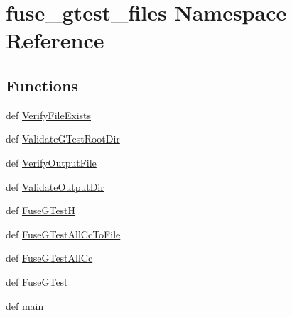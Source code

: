 \hypertarget{namespacefuse__gtest__files}{\section{fuse\-\_\-gtest\-\_\-files Namespace Reference}
\label{namespacefuse__gtest__files}
}
\subsection*{Functions}
\begin{DoxyCompactItemize}
\item 
def \hyperlink{namespacefuse__gtest__files_a1192ccd4053c7380b9aae5ca1b620665}{Verify\-File\-Exists}
\item 
def \hyperlink{namespacefuse__gtest__files_ab9e4a4d901cebc66da1e309705bfcac4}{Validate\-G\-Test\-Root\-Dir}
\item 
def \hyperlink{namespacefuse__gtest__files_a144f7340d0a2d0c8fd4981e28720e79a}{Verify\-Output\-File}
\item 
def \hyperlink{namespacefuse__gtest__files_a348cabb513c9b46663e68f28487f45b9}{Validate\-Output\-Dir}
\item 
def \hyperlink{namespacefuse__gtest__files_acaaf18fcbfe37616311a2ab798f93e88}{Fuse\-G\-Test\-H}
\item 
def \hyperlink{namespacefuse__gtest__files_a5bd70f8474de0223e5645df52f5629ee}{Fuse\-G\-Test\-All\-Cc\-To\-File}
\item 
def \hyperlink{namespacefuse__gtest__files_a2b13eae2bd8489b27aa4399d9b6e5c5b}{Fuse\-G\-Test\-All\-Cc}
\item 
def \hyperlink{namespacefuse__gtest__files_a6fdf9baef71acf9fa935b3f0ca611edc}{Fuse\-G\-Test}
\item 
def \hyperlink{namespacefuse__gtest__files_aa2e9cc05cf80b8f56f08eade06b8c9ed}{main}
\end{DoxyCompactItemize}
